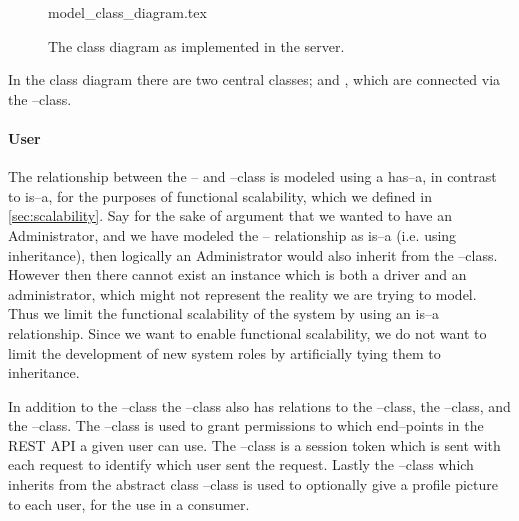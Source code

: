 \begin{figure}[p]
    \begin{center}
        {model_class_diagram.tex}
        \caption{The class diagram as implemented in the server.}\label{fig:model_class_diagram}
    \end{center}
\end{figure}

In the class diagram there are two central classes;  and , which are connected via the --class.
\paragraph*{User}
The relationship between the -- and --class is modeled using a has--a, in contrast to is--a, for the purposes of functional scalability, which we defined in \cref{sec:scalability}.
Say for the sake of argument that we wanted to have an Administrator, and we have modeled the -- relationship as is--a (i.e. using inheritance), 
then logically an Administrator would also inherit from the --class.
However then there cannot exist an instance which is both a driver and an administrator, which might not represent the reality we are trying to model. 
Thus we limit the functional scalability of the system by using an is--a relationship. 
Since we want to enable functional scalability, we do not want to limit the development of new system roles by artificially tying them to inheritance.

In addition to the --class the --class also has relations to the --class, the --class, and the --class.
The --class is used to grant permissions to which end--points in the REST API a given user can use. 
The --class is a session token which is sent with each request to identify which user sent the request. 
Lastly the --class which inherits from the abstract class --class is used to optionally give a profile picture to each user, for the use in a consumer. 

